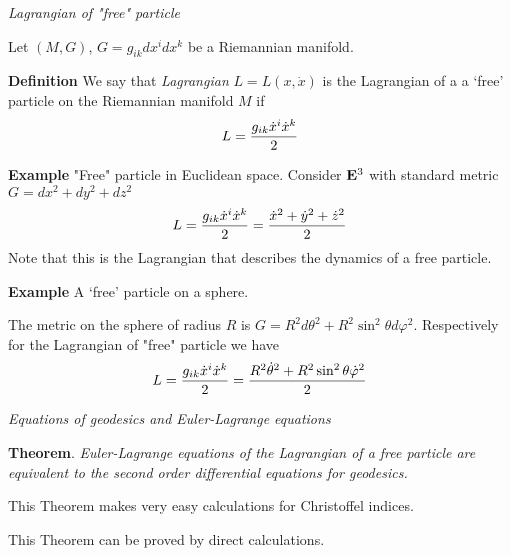\documentclass[12pt]{article}
\theoremstyle{theorem}
\numberwithin{equation}{section}
\begin{document}
{\m

    \centerline {\it Lagrangian of "free" particle}

\smallskip

     Let $(M,G)$, $G=g_{ik}dx^idx^k$ be a Riemannian manifold.


     {\bf Definition} We say that {\it Lagrangian} $L=L(x,\dot x)$ 
 is the Lagrangian of a a `free' particle on the
     Riemannian manifold $M$ if
      \begin{equation}\label{frepaticlelagrangian}
        L={g_{ik}\dot x^i\dot x^k\over 2}
      \end{equation}

{\bf Example} "Free" particle in Euclidean space.
    Consider ${\bf E}^3$ with standard metric $G=dx^2+dy^2+dz^2$
      \begin{equation}\label{freeparticleineuclideanspace}
        L={g_{ik}\dot x^i\dot x^k\over 2}={\dot x^2+\dot y^2+\dot z^2\over 2}
      \end{equation}
Note that this is the Lagrangian that describes the dynamics 
of a free particle.

\m

{\bf Example} A `free' particle on a sphere.

The metric on the sphere of radius $R$ is
$G=R^2d\theta^2+R^2\sin^2\theta d\varphi^2$.
Respectively for the Lagrangian of "free" particle we have
\begin{equation}\label{freeparticleonthesphere}
        L={g_{ik}\dot x^i\dot x^k\over 2}={R^2\dot\theta^2+R^2\sin^2\theta\dot \varphi^2\over 2}
      \end{equation}


\m

\centerline {\it Equations of geodesics and Euler-Lagrange equations}

\m


{\bf Theorem}. {\it Euler-Lagrange equations of the 
Lagrangian of a free particle are equivalent
to the second order differential equations
for geodesics.}

This Theorem makes very easy calculations for Christoffel indices.

\m

 This Theorem can be proved by direct calculations.

}
\end{document}
